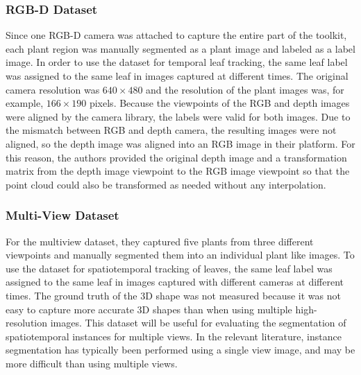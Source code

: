 \subsubsection{RGB-D Dataset}
Since one RGB-D camera was attached to capture the entire part of the toolkit, each plant region was manually segmented as a plant image
and labeled as a label image. In order to use the dataset for temporal leaf tracking, the same leaf label was assigned to the same leaf in
images captured at different times. The original camera resolution was $640 \times 480$ and the resolution of the plant images was, for example,
$166 \times 190$ pixels. Because the viewpoints of the RGB and depth images were aligned by the camera library, the labels were valid for both images.
Due to the mismatch between RGB and depth camera, the resulting images were not aligned, so the depth image was aligned into an RGB image in their
platform. For this reason, the authors provided the original depth image and a transformation matrix from the depth image viewpoint to the RGB image
viewpoint so that the point cloud could also be transformed as needed without any interpolation.

\subsubsection{Multi-View Dataset}
For the multiview dataset, they captured five plants from three different viewpoints and manually segmented them into an individual plant
like images. To use the dataset for spatiotemporal tracking of leaves, the same leaf label was assigned to the same leaf in images
captured with different cameras at different times. The ground truth of the 3D shape was not measured because it was not easy to
capture more accurate 3D shapes than when using multiple high-resolution images. This dataset will be useful for evaluating the
segmentation of spatiotemporal instances for multiple views. In the relevant literature, instance segmentation has typically been
performed using a single view image, and may be more difficult than using multiple views.

